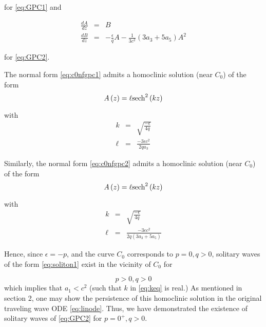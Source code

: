 for \eqref{eq:GPC1} and

\begin{subequations}\label{eq:c0nfgpc2}
\begin{eqnarray}
\frac{dA}{dz} &=& B \\
\frac{dB}{dz} &=& -\frac{\epsilon}{q} A - \frac{1}{3 c^2} \left(3 a_3 + 5 a_5 \right) A^2
\end{eqnarray}
\end{subequations}

for \eqref{eq:GPC2}.

The normal form \eqref{eq:c0nfgpc1} admits a homoclinic solution (near $C_0$) of the form 
\begin{equation} \label{eq:soliton1}
A\left(z\right) = \ell \space \mathrm{sech}^2\left(k z\right)
\end{equation}

with 
\begin{subequations} 
\begin{eqnarray}
k &=& \sqrt{\frac{-\epsilon}{4q}}  \\
\ell &=& \frac{ - 3 \epsilon c^2 }{2 q a_3 } 
\end{eqnarray}
\end{subequations}


Similarly, the normal form \eqref{eq:c0nfgpc2} admits a homoclinic solution (near $C_0$) of the form 
\begin{equation}\label{eq:soliton2}
A\left(z\right) = \ell \space \mathrm{sech}^2\left(k z\right)
\end{equation}

with 
\begin{subequations} 
\begin{eqnarray}
k &=& \sqrt{\frac{-\epsilon}{4q}} \label{eq:keq} \\
\ell &=& \frac{ - 3 \epsilon c^2 }{2 q \left(3 a_3 + 5 a_5\right) } 
\end{eqnarray}
\end{subequations}

Hence, since $\epsilon = - p $, and the curve $C_0$ corresponds to $p=0,q>0$, solitary waves of the 
form \eqref{eq:soliton1} exist in the vicinity of $C_0$ for 

\begin{equation}
p > 0, q > 0 
\end{equation}
which implies that $a_1 < c^2 $ (such that $k$ in \eqref{eq:keq} is real.)  As mentioned in section 2, one may show the persistence
of this homoclinic solution in the original traveling wave ODE \eqref{eq:linode}. Thus, we have 
demonstrated the existence of solitary waves of \eqref{eq:GPC2} for $p=0^+, q>0$. 

